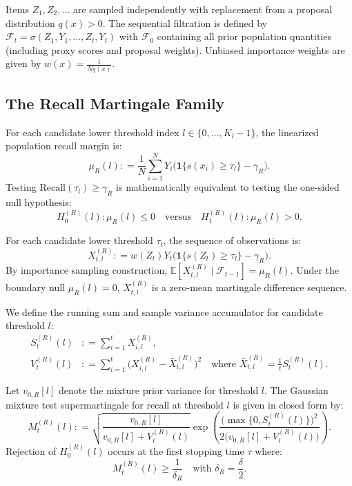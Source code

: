 \documentclass[11pt,a4paper]{article}
\newcommand{\coloneqq}{\mathrel{\mathop:}=}
\begin{document}
Items $Z_1, Z_2, \dots$ are sampled independently with replacement from a proposal distribution $q(x) > 0$. The sequential filtration is defined by $\mathcal{F}_t = \sigma(Z_1, Y_1, \dots, Z_t, Y_t)$ with $\mathcal{F}_0$ containing all prior population quantities (including proxy scores and proposal weights). Unbiased importance weights are given by $w(x) = \frac{1}{N q(x)}$.

\subsection{The Recall Martingale Family}
For each candidate lower threshold index $l \in \{0, \dots, K_l-1\}$, the linearized population recall margin is:
\begin{equation}\label{eq:recall_margin}
\mu_R(l) \coloneqq \frac{1}{N}\sum_{i=1}^N Y_i \big(\mathbf{1}\{s(x_i) \ge \tau_l\} - \gamma_R\big).
\end{equation}
Testing $\text{Recall}(\tau_l) \ge \gamma_R$ is mathematically equivalent to testing the one-sided null hypothesis:
\begin{equation}\label{eq:h0_recall}
H_0^{(R)}(l) : \mu_R(l) \le 0 \quad \text{versus} \quad H_1^{(R)}(l) : \mu_R(l) > 0.
\end{equation}

For each candidate lower threshold $\tau_l$, the sequence of observations is:
\begin{equation}\label{eq:obs_recall}
X_{t, l}^{(R)} \coloneqq w(Z_t) Y_t \big(\mathbf{1}\{s(Z_t) \ge \tau_l\} - \gamma_R\big).
\end{equation}
By importance sampling construction, $\mathbb{E}[X_{t, l}^{(R)} \mid \mathcal{F}_{t-1}] = \mu_R(l)$. Under the boundary null $\mu_R(l) = 0$, $X_{t, l}^{(R)}$ is a zero-mean martingale difference sequence.

We define the running sum and sample variance accumulator for candidate threshold $l$:
\begin{align}
S_t^{(R)}(l) &\coloneqq \sum_{i=1}^t X_{i, l}^{(R)}, \label{eq:st_recall} \\
V_t^{(R)}(l) &\coloneqq \sum_{i=1}^t \big(X_{i, l}^{(R)} - \bar{X}_{t, l}^{(R)}\big)^2 \quad \text{where } \bar{X}_{t, l}^{(R)} = \frac{1}{t} S_t^{(R)}(l). \label{eq:vt_recall}
\end{align}

Let $v_{0, R}[l]$ denote the mixture prior variance for threshold $l$. The Gaussian mixture test supermartingale for recall at threshold $l$ is given in closed form by:
\begin{equation}\label{eq:gm_recall}
M_t^{(R)}(l) \coloneqq \sqrt{\frac{v_{0, R}[l]}{v_{0, R}[l] + V_t^{(R)}(l)}} \exp\left( \frac{\big(\max\{0, S_t^{(R)}(l)\}\big)^2}{2\big(v_{0, R}[l] + V_t^{(R)}(l)\big)} \right).
\end{equation}
Rejection of $H_0^{(R)}(l)$ occurs at the first stopping time $\tau$ where:
\begin{equation}\label{eq:reject_recall}
M_t^{(R)}(l) \ge \frac{1}{\delta_R} \quad \text{with } \delta_R = \frac{\delta}{2}.
\end{equation}
\end{document}
